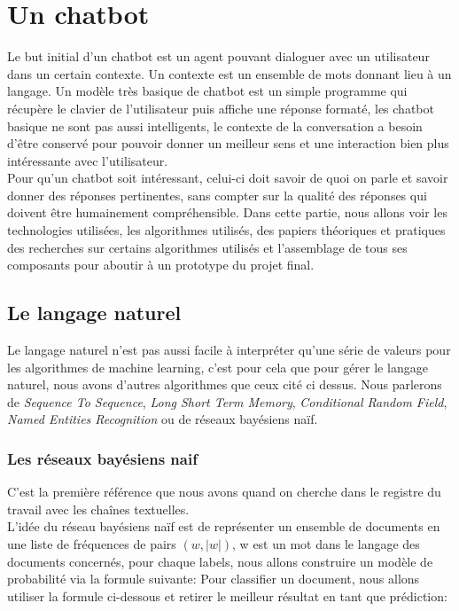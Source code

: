 
\part{Un chatbot}

Le but initial d'un chatbot est un agent pouvant dialoguer avec un utilisateur dans un certain contexte. Un contexte est un ensemble de mots donnant lieu à un langage.\linebreak
Un modèle très basique de chatbot est un simple programme qui récupère le clavier de l'utilisateur puis affiche une réponse formaté, les chatbot basique ne sont pas aussi intelligents, le contexte de la conversation a besoin d'être conservé pour pouvoir donner un meilleur sens et une interaction bien plus intéressante avec l'utilisateur.\linebreak
\\
Pour qu'un chatbot soit intéressant, celui-ci doit savoir de quoi on parle et savoir donner des réponses pertinentes, sans compter sur la qualité des réponses qui doivent être humainement compréhensible.\linebreak
\linebreak
Dans cette partie, nous allons voir les technologies utilisées, les algorithmes utilisés, des papiers théoriques et pratiques des recherches sur certains algorithmes utilisés et l'assemblage de tous ses composants pour aboutir à un prototype du projet final.

\chapter{Le langage naturel}

Le langage naturel n'est pas aussi facile à interpréter qu'une série de valeurs pour les algorithmes de machine learning, c'est pour cela que pour gérer le langage naturel, nous avons d'autres algorithmes que ceux cité ci dessus.
Nous parlerons de \textit{Sequence To Sequence}, \textit{Long Short Term Memory},  \textit{Conditional Random Field}, \textit{Named Entities Recognition} ou de réseaux bayésiens naïf.\\

\pagebreak
\section{Les réseaux bayésiens naif}

C'est la première référence que nous avons quand on cherche dans le registre du travail avec les chaînes textuelles.\\
L'idée du réseau bayésiens naïf est de représenter un ensemble de documents en une liste de fréquences de pairs $(w, |w|)$, w est un mot dans le langage des documents concernés, pour chaque labels, nous allons construire un modèle de probabilité via la formule suivante:
Pour classifier un document, nous allons utiliser la formule ci-dessous et retirer le meilleur résultat en tant que prédiction:

